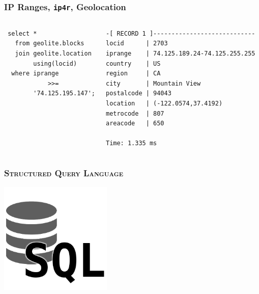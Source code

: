 \documentclass{beamer}
\begin{document}
\begin{frame}[fragile]
  \frametitle{IP Ranges, \texttt{ip4r}, Geolocation}

  \vfill

\begin{columns}
\begin{verbatim}
 select *
   from geolite.blocks
   join geolite.location
        using(locid)
  where iprange
            >>=
        '74.125.195.147';
\end{verbatim}
\begin{verbatim}
-[ RECORD 1 ]----------------------------
locid      | 2703
iprange    | 74.125.189.24-74.125.255.255
country    | US
region     | CA
city       | Mountain View
postalcode | 94043
location   | (-122.0574,37.4192)
metrocode  | 807
areacode   | 650

Time: 1.335 ms
\end{verbatim}
\end{columns}
\end{frame}

\begin{frame}
  \frametitle{\textsc{Structured Query Language}}

  \begin{center}
    \includegraphics[height=2.1in]{sql.png}
  \end{center}
\end{frame}
\end{document}
